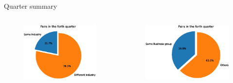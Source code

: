 \documentclass{beamer}
\begin{document}
			\begin{frame}{Quarter summary}\label{Monthly22}
		
\begin{columns}
	\begin{figure}   
		\centering
		\includegraphics[width=\linewidth]{"sameIndustryinQuarter.eps"}     \end{figure}            
	\begin{figure}
		\centering  
		\includegraphics[width=\linewidth]{"sameIBGinQuarter.eps"}
	\end{figure}
\end{columns}
\centering
			
			
			
		\end{frame}
		
\end{document}
